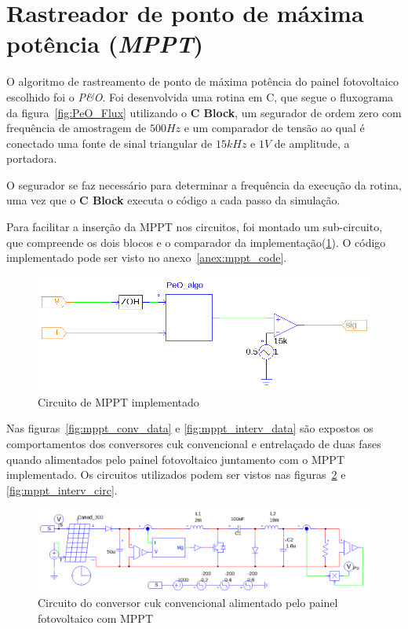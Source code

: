 \documentclass[
	12pt,				%
	openany,
	onseside,
	a4paper,			%
	english,			%
	french,				%
	spanish,			%
	brazil,				%
	]{abntex2}
\begin{document}
\section{Rastreador de ponto de máxima potência (\textit{MPPT})}\label{sec:met_mppt}

O algoritmo de rastreamento de ponto de máxima potência do painel fotovoltaico escolhido foi o \textit{P\&O}. Foi desenvolvida uma rotina em C, que segue o fluxograma da figura~\ref{fig:PeO_Flux} utilizando o \textbf{C Block}, um segurador de ordem zero com frequência de amostragem de $500Hz$ e um comparador de tensão ao qual é conectado uma fonte de sinal triangular de $15kHz$ e $1V$ de amplitude, a portadora.

O segurador se faz necessário para determinar a frequência da execução da rotina, uma vez que o \textbf{C Block} executa o código a cada passo da simulação.

Para facilitar a inserção da MPPT nos circuitos, foi montado um sub-circuito, que compreende os dois blocos e o comparador da implementação(\ref{fig:mppt_subcircuit}). O código implementado pode ser visto no anexo~\ref{anex:mppt_code}.

\begin{figure}[htb]%
	\begin{center}%
		\includegraphics[width=0.85 \linewidth]{mppt_psim_circ}
		\caption{Circuito de MPPT implementado}
		\label{fig:mppt_subcircuit}
	\end{center}
\end{figure}

Nas figuras~\ref{fig:mppt_conv_data} e \ref{fig:mppt_interv_data} são expostos os comportamentos dos conversores cuk convencional e entrelaçado de duas fases quando alimentados pelo painel fotovoltaico juntamento com o MPPT implementado. Os circuitos utilizados podem ser vistos nas figuras~\ref{fig:mppt_conv_circ} e \ref{fig:mppt_interv_circ}.

\begin{figure}[htb]%
	\captionsetup{justification=centering}%
	\begin{center}%
		\includegraphics[width= \linewidth]{mppt_conv_circ}
		\caption{Circuito do conversor cuk convencional alimentado pelo painel fotovoltaico com MPPT}
		\label{fig:mppt_conv_circ}
	\end{center}
\end{figure}
\end{document}
